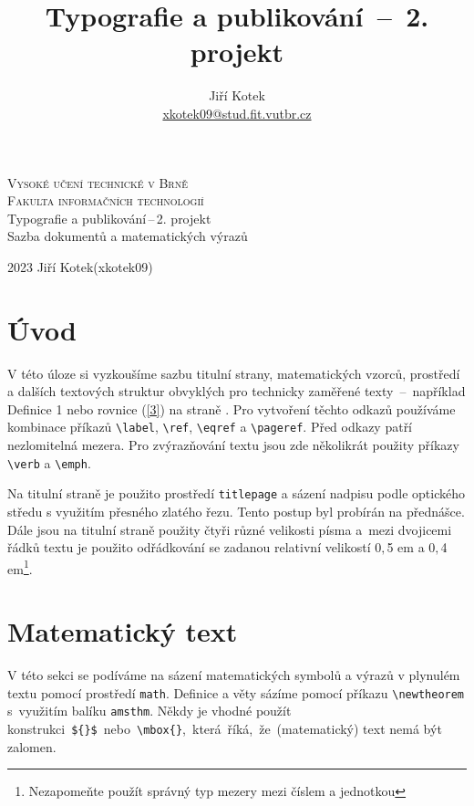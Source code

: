 \documentclass [11pt, a4paper, twocolumn] {article}
\title{Typografie a publikování  \,--\, 2. projekt}
\author{Jiří Kotek \\ \href{mailto:xkotek09@stud.fit.vutbr.cz}{xkotek09@stud.fit.vutbr.cz}}
\date{}
\begin{document}
    
    \begin{titlepage}
        \begin{center}
        \Huge
        \textsc{Vysoké učení technické v Brně\\
        \huge
        {Fakulta informačních technologií}\\}
        \LARGE
        Typografie a publikování\,--\,2. projekt \\
        Sazba dokumentů a matematických výrazů
        \end{center} 
        {\Large 2023 \hfill
        Jiří Kotek(xkotek09)}
    \end{titlepage}

    \section*{Úvod}
V této úloze si vyzkoušíme sazbu titulní strany, matematických vzorců, prostředí a dalších textových struktur obvyklých pro technicky zaměřené texty \,--\, například Definice 1 nebo rovnice (\ref{3}) na straně \pageref{3}. 
Pro vytvoření těchto odkazů používáme kombinace příkazů \verb|\label|, \verb|\ref|, \verb|\eqref| a \verb|\pageref|. 
Před odkazy patří nezlomitelná mezera. Pro zvýrazňování textu jsou zde několikrát použity příkazy \verb|\verb| a \verb|\emph|.

Na titulní straně je použito prostředí \verb|titlepage| a sázení nadpisu podle optického středu s využitím přesného zlatého řezu. 
Tento postup byl probírán na přednášce. 
Dále jsou na titulní straně použity čtyři různé velikosti písma a~mezi dvojicemi řádků textu je použito odřádkování se zadanou relativní velikostí 0${,}$5 em a 0${,}$4 em\footnote [1]{Nezapomeňte použít správný typ mezery mezi číslem a jednotkou}.

\section{Matematický text}
V této sekci se podíváme na sázení matematických symbolů a výrazů v plynulém textu pomocí prostředí \verb|math|.
Definice a věty sázíme pomocí příkazu \verb|\newtheorem| s~využitím balíku \verb|amsthm|. Někdy je vhodné použít konstrukci~\verb|${}$|~nebo~\verb|\mbox{}|,~která~říká,~že~\mbox{(matematický)} text nemá být zalomen. 
\end{document}
